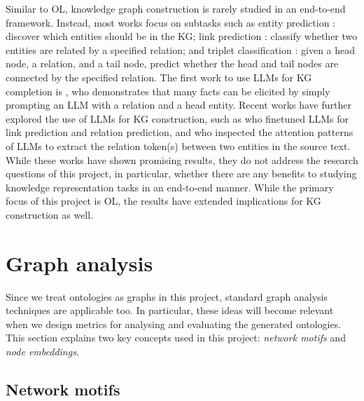 Similar to OL, knowledge graph construction is rarely studied in an end-to-end framework. Instead, most works focus on subtasks such as entity prediction \cite{lin2015modeling,xie2016representation}: discover which entities should be in the KG; link prediction \cite{liben2003link,trouillon2016complex}: classify whether two entities are related by a specified relation; and triplet classification \cite{lin2015learning,wang2014knowledge}: given a head node, a relation, and a tail node, predict whether the head and tail nodes are connected by the specified relation. The first work to use LLMs for KG completion is \citet{petroni2019language}, who demonstrates that many facts can be elicited by simply prompting an LLM with a relation and a head entity. Recent works have further explored the use of LLMs for KG construction, such as \citet{yao2023exploring} who finetuned LLMs for link prediction and relation prediction, and \citet{wang2020language} who inspected the attention patterns of LLMs to extract the relation token(s) between two entities in the source text. While these works have shown promising results, they do not address the research questions of this project, in particular, whether there are any benefits to studying knowledge representation tasks in an end-to-end manner. While the primary focus of this project is OL, the results have extended implications for KG construction as well.

\section{Graph analysis}

Since we treat ontologies as graphs in this project, standard graph analysis techniques are applicable too. In particular, these ideas will become relevant when we design metrics for analysing and evaluating the generated ontologies. This section explains two key concepts used in this project: \emph{network motifs} and \emph{node embeddings}.

\subsection{Network motifs}  \label{sec:network-motifs}

